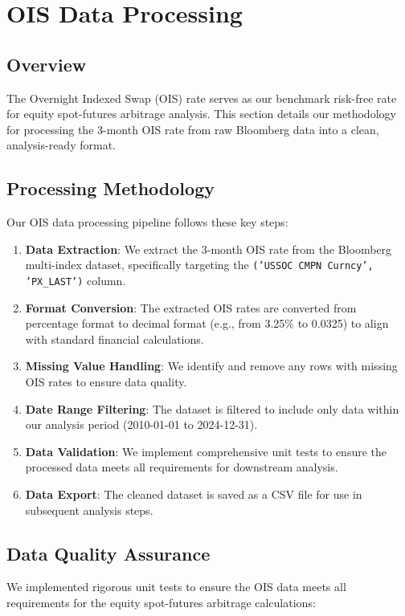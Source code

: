 \documentclass{article}
\begin{document}
\section{OIS Data Processing}
\subsection{Overview}
The Overnight Indexed Swap (OIS) rate serves as our benchmark risk-free rate for equity spot-futures arbitrage analysis. This section details our methodology for processing the 3-month OIS rate from raw Bloomberg data into a clean, analysis-ready format.

\subsection{Processing Methodology}
Our OIS data processing pipeline follows these key steps:

\begin{enumerate}
  \item \textbf{Data Extraction}: We extract the 3-month OIS rate from the Bloomberg multi-index dataset, specifically targeting the \texttt{('USSOC CMPN Curncy', 'PX\_LAST')} column.
  
  \item \textbf{Format Conversion}: The extracted OIS rates are converted from percentage format to decimal format (e.g., from 3.25\% to 0.0325) to align with standard financial calculations.
  
  \item \textbf{Missing Value Handling}: We identify and remove any rows with missing OIS rates to ensure data quality.
  
  \item \textbf{Date Range Filtering}: The dataset is filtered to include only data within our analysis period (2010-01-01 to 2024-12-31).
  
  \item \textbf{Data Validation}: We implement comprehensive unit tests to ensure the processed data meets all requirements for downstream analysis.
  
  \item \textbf{Data Export}: The cleaned dataset is saved as a CSV file for use in subsequent analysis steps.
\end{enumerate}

\subsection{Data Quality Assurance}
We implemented rigorous unit tests to ensure the OIS data meets all requirements for the equity spot-futures arbitrage calculations:
\end{document}
